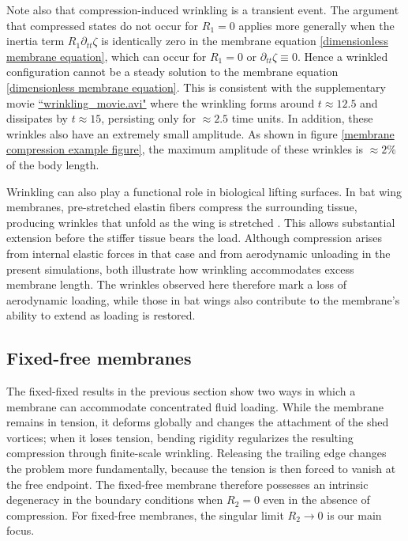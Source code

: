 \documentclass{article}[12pt]
\theoremstyle{Theorem}
\begin{document}
Note also that compression-induced wrinkling is a transient event. The argument that compressed states do not occur for $R_1 = 0$ applies more generally when the inertia term $R_1\partial_{tt}\zeta$ is identically zero in the membrane equation \eqref{dimensionless membrane equation}, which can occur for $R_1 = 0$ or $\partial_{tt}\zeta \equiv 0$. Hence a wrinkled configuration cannot be a steady solution to the membrane equation \eqref{dimensionless membrane equation}. This is consistent with the supplementary movie \href{https://drive.google.com/file/d/1CGcG94oydSZJySB4c7xGAOxGPoc7pN9P/view?usp=drive_link}{``wrinkling\_movie.avi"} where the wrinkling forms around $t \approx 12.5$ and dissipates by $t\approx 15$, persisting only for $\approx2.5$ time units. In addition, these wrinkles also have an extremely small amplitude. As shown in figure \ref{membrane compression example figure}, the maximum amplitude of these wrinkles is $\approx 2\%$ of the body length.
\newline

Wrinkling can also play a functional role in biological lifting surfaces. In bat wing membranes, pre-stretched elastin fibers compress the surrounding tissue, producing wrinkles that unfold as the wing is stretched \cite{cheney2015wrinkle}. This allows substantial extension before the stiffer tissue bears the load. Although compression arises from internal elastic forces in that case and from aerodynamic unloading in the present simulations, both illustrate how wrinkling accommodates excess membrane length. The wrinkles observed here therefore mark a loss of aerodynamic loading, while those in bat wings also contribute to the membrane's ability to extend as loading is restored.

\subsection{Fixed-free membranes}
\label{fixed free membranes section}
The fixed-fixed results in the previous section show two ways in which a membrane can accommodate concentrated fluid loading. While the membrane remains in tension, it deforms globally and changes the attachment of the shed vortices; when it loses tension, bending rigidity regularizes the resulting compression through finite-scale wrinkling. Releasing the trailing edge changes the problem more fundamentally, because the tension is then forced to vanish at the free endpoint. The fixed-free membrane therefore possesses an intrinsic degeneracy in the boundary conditions when $R_2 = 0$ even in the absence of compression. For fixed-free membranes, the singular limit $R_2 \to 0$ is our main focus.
\newline
\end{document}
